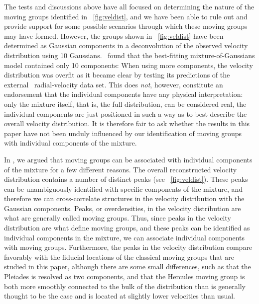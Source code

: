 The tests and discussions above have all focused on determining the
nature of the moving groups identified in
\figurename~\ref{fig:veldist}, and we have been able to rule out and
provide support for some possible scenarios through which these moving
groups may have formed. However, the groups shown in
\figurename~\ref{fig:veldist} have been determined as Gaussian
components in a deconvolution of the observed velocity distribution
using 10 Gaussians. \bhr\ found that the best-fitting
mixture-of-Gaussians model contained only 10 components: When using
more components, the velocity distribution was overfit as it became
clear by testing its predictions of the external \gcsabb\
radial-velocity data set. This does \emph{not}, however, constitute an
endorsement that the individual components have any physical
interpretation: only the mixture itself, that is, the full
distribution, can be considered real, the individual components are
just positioned in such a way as to best describe the overall velocity
distribution. It is therefore fair to ask whether the results in this
paper have not been unduly influenced by our identification of moving
groups with individual components of the mixture.

In \bhr, we argued that moving groups can be associated with
individual components of the mixture for a few different reasons. The
overall reconstructed velocity distribution contains a number of
distinct peaks (see \figurename~\ref{fig:veldist}). These peaks can be
unambiguously identified with specific components of the mixture, and
therefore we can cross-correlate structures in the velocity
distribution with the Gaussian components. Peaks, or overdensities, in
the velocity distribution are what are generally called moving
groups. Thus, since peaks in the velocity distribution are what define
moving groups, and these peaks can be identified as individual
components in the mixture, we can associate individual components with
moving groups. Furthermore, the peaks in the velocity distribution
compare favorably with the fiducial locations of the classical moving
groups that are studied in this paper, although there are some small
differences, such as that the Pleiades is resolved as two components,
and that the Hercules moving group is both more smoothly connected to
the bulk of the distribution than is generally thought to be the case
and is located at slightly lower velocities than usual.

